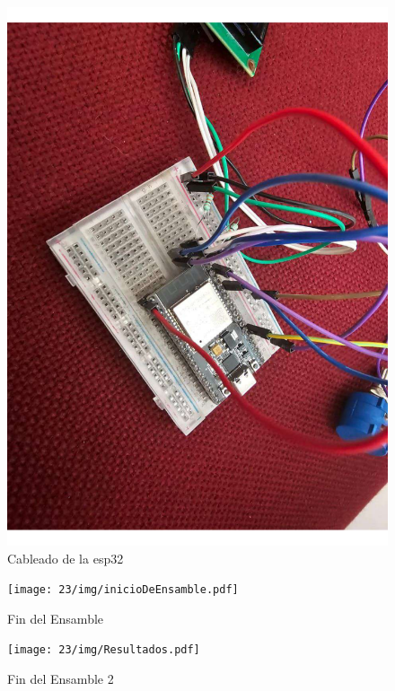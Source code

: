     \begin{figure}[H]
        \centering
        \includegraphics[trim = {7mm 1mm 1mm 1mm},clip,scale=0.25]{23/img/primerResultado.pdf}
        \caption{Cableado de la esp32}
        \label{fig:evi1}
    \end{figure}
    
    \begin{figure}[H]
        \centering
        \texttt{[image: 23/img/inicioDeEnsamble.pdf]}
        \caption{Fin del Ensamble}
        \label{fig:evi1}
    \end{figure}

     
    \begin{figure}[H]
        \centering
        \texttt{[image: 23/img/Resultados.pdf]}
        \caption{Fin del Ensamble 2}
        \label{fig:evi1}
    \end{figure}

